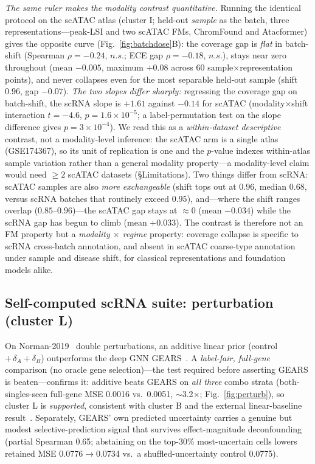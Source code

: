 \documentclass[fleqn,10pt,lineno]{wlpeerj}  %
\begin{document}
\emph{The same ruler makes the modality contrast quantitative.} Running the identical protocol on the scATAC atlas (cluster I; held-out \emph{sample} as the batch, three representations---peak-LSI and two scATAC FMs, ChromFound and Atacformer) gives the opposite curve (Fig.~\ref{fig:batchdose}B): the coverage gap is \emph{flat} in batch-shift (Spearman $\rho=-0.24$, $n.s.$; ECE gap $\rho=-0.18$, $n.s.$), stays near zero throughout (mean $-0.005$, maximum $+0.08$ across 60 sample$\times$representation points), and never collapses even for the most separable held-out sample (shift $0.96$, gap $-0.07$). \emph{The two slopes differ sharply:} regressing the coverage gap on batch-shift, the scRNA slope is $+1.61$ against $-0.14$ for scATAC (modality$\times$shift interaction $t=-4.6$, $p=1.6\times10^{-5}$; a label-permutation test on the slope difference gives $p=3\times10^{-4}$). We read this as a \emph{within-dataset descriptive} contrast, not a modality-level inference: the scATAC arm is a single atlas (GSE174367), so its unit of replication is one and the $p$-value indexes within-atlas sample variation rather than a general modality property---a modality-level claim would need $\geq2$ scATAC datasets (\S Limitations). Two things differ from scRNA: scATAC samples are also \emph{more exchangeable} (shift tops out at $0.96$, median $0.68$, versus scRNA batches that routinely exceed $0.95$), and---where the shift ranges overlap ($0.85$--$0.96$)---the scATAC gap stays at $\approx 0$ (mean $-0.034$) while the scRNA gap has begun to climb (mean $+0.033$). The contrast is therefore not an FM property but a \emph{modality $\times$ regime} property: coverage collapse is specific to scRNA cross-batch annotation, and absent in scATAC coarse-type annotation under sample and disease shift, for classical representations and foundation models alike.

\subsection{Self-computed scRNA suite: perturbation (cluster L)}
On Norman-2019~\cite{norman2019} double perturbations, an additive linear prior (control $+\,\delta_A+\delta_B$) outperforms the deep GNN GEARS~\cite{roohani2024}. A \emph{label-fair, full-gene} comparison (no oracle gene selection)---the test required before asserting GEARS is beaten---confirms it: additive beats GEARS on \emph{all three} combo strata (both-singles-seen full-gene MSE 0.0016 vs.\ 0.0051, $\sim$3.2$\times$; Fig.~\ref{fig:perturb}), so cluster L is \emph{supported}, consistent with cluster B and the external linear-baseline result~\cite{ahlmann2025}. Separately, GEARS' own predicted uncertainty carries a genuine but modest selective-prediction signal that survives effect-magnitude deconfounding (partial Spearman 0.65; abstaining on the top-30\% most-uncertain cells lowers retained MSE 0.0776$\to$0.0734 vs.\ a shuffled-uncertainty control 0.0775).
\end{document}
